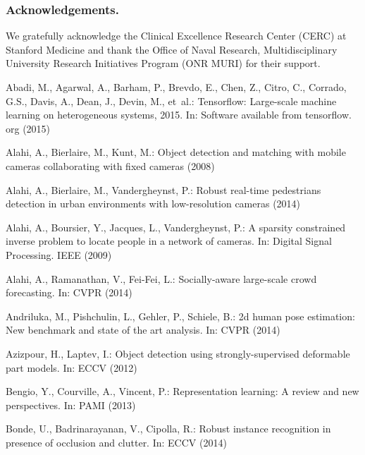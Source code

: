 \documentclass[runningheads]{llncs}
\begin{document}
	\subsubsection{Acknowledgements.}
	We gratefully acknowledge the Clinical Excellence Research Center (CERC) at Stanford Medicine and thank the Office of Naval Research, Multidisciplinary University Research Initiatives Program (ONR MURI) for their support.

\clearpage

\begin{thebibliography}{10}
	\providecommand{\url}[1]{\texttt{#1}}
	\providecommand{\urlprefix}{URL }

	Abadi, M., Agarwal, A., Barham, P., Brevdo, E., Chen, Z., Citro, C., Corrado,
	G.S., Davis, A., Dean, J., Devin, M., et~al.: Tensorflow: Large-scale machine
	learning on heterogeneous systems, 2015. In: Software available from
	tensorflow. org (2015)

	Alahi, A., Bierlaire, M., Kunt, M.: Object detection and matching with mobile
	cameras collaborating with fixed cameras (2008)

	Alahi, A., Bierlaire, M., Vandergheynst, P.: Robust real-time pedestrians
	detection in urban environments with low-resolution cameras  (2014)

	Alahi, A., Boursier, Y., Jacques, L., Vandergheynst, P.: A sparsity constrained
	inverse problem to locate people in a network of cameras. In: Digital Signal
	Processing. IEEE (2009)

	Alahi, A., Ramanathan, V., Fei-Fei, L.: Socially-aware large-scale crowd
	forecasting. In: CVPR (2014)

	Andriluka, M., Pishchulin, L., Gehler, P., Schiele, B.: 2d human pose
	estimation: New benchmark and state of the art analysis. In: CVPR (2014)

	Azizpour, H., Laptev, I.: Object detection using strongly-supervised deformable
	part models. In: ECCV (2012)

	Bengio, Y., Courville, A., Vincent, P.: Representation learning: A review and
	new perspectives. In: PAMI (2013)

	Bonde, U., Badrinarayanan, V., Cipolla, R.: Robust instance recognition in
	presence of occlusion and clutter. In: ECCV (2014)


\end{thebibliography}
\end{document}
